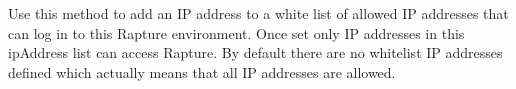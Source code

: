 Use this method to add an IP address to a white list of allowed IP addresses that can
log in to this Rapture environment. Once set only IP addresses in this ipAddress list
can access Rapture. By default there are no whitelist IP addresses defined which actually
means that all IP addresses are allowed.
